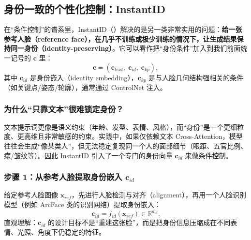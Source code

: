 \documentclass[zihao=-4, fontset=windows]{ctexart}
\begin{document}
\subsection{身份一致的个性化控制：InstantID}

在“条件控制”的谱系里，InstantID（\cite{instantid2024}）解决的是另一类非常实用的问题：\textbf{给一张参考人脸（reference face），在几乎不训练或极少训练的情况下，让生成结果保持同一身份（identity-preserving）}。它可以看作把“身份条件”加入到我们前面统一记号的 $\mathbf{c}$ 里：
\begin{equation}
    \mathbf{c}=(\mathbf{c}_{text},\;\mathbf{c}_{id},\;\mathbf{c}_{kp}),
\end{equation}
其中 $\mathbf{c}_{id}$ 是身份嵌入（identity embedding），$\mathbf{c}_{kp}$ 是与人脸几何结构强相关的条件（如关键点/姿态/轮廓），通常通过 ControlNet 注入。

\subsubsection{为什么“只靠文本”很难锁定身份？}
文本提示词更像是语义约束（年龄、发型、表情、风格），而“身份”是一个更细粒度、更高维且非常敏感的约束。实践中，如果仅依赖文本 Cross-Attention，模型往往会生成“像某类人”，但无法稳定复现同一个人的面部细节（眼距、五官比例、痣/皱纹等）。因此 InstantID 引入了一个专门的身份向量 $\mathbf{c}_{id}$ 来做条件控制。

\subsubsection{步骤 1：从参考人脸提取身份嵌入 $\mathbf{c}_{id}$}
给定参考人脸图像 $\mathbf{x}_{ref}$，先进行人脸检测与对齐（alignment），再用一个人脸识别模型（例如 ArcFace 类的识别网络）提取身份嵌入：
\begin{equation}
    \mathbf{c}_{id} = f_{id}(\mathbf{x}_{ref})\in\mathbb{R}^{d_{id}}.
\end{equation}
直观理解：$\mathbf{c}_{id}$ 的设计目标不是“重建这张脸”，而是把身份信息压缩成在不同表情、光照、角度下仍稳定的特征。
\end{document}
